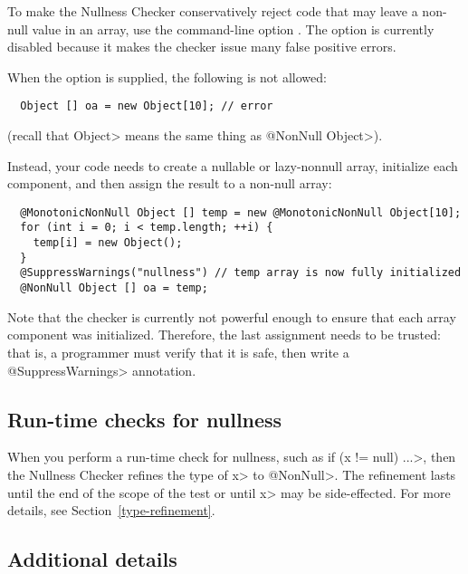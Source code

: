 To make the Nullness Checker conservatively reject code that may leave a
non-null value in an array, use the command-line option
.  The option is currently disabled
because it makes the checker issue many false positive errors.

When the  option is supplied,
the following is not allowed:

\begin{Verbatim}
  Object [] oa = new Object[10]; // error
\end{Verbatim}

\noindent
(recall that \<Object> means the same thing as \<@NonNull Object>).

Instead, your code needs to create a nullable or lazy-nonnull array, initialize
each component, and then assign the result to a non-null array:

\begin{Verbatim}
  @MonotonicNonNull Object [] temp = new @MonotonicNonNull Object[10];
  for (int i = 0; i < temp.length; ++i) {
    temp[i] = new Object();
  }
  @SuppressWarnings("nullness") // temp array is now fully initialized
  @NonNull Object [] oa = temp;
\end{Verbatim}

Note that the checker is currently not powerful enough to ensure that
each array component was initialized. Therefore, the last assignment
needs to be trusted:  that is, a programmer must verify that it is safe,
then write a \<@SuppressWarnings> annotation.




\subsection{Run-time checks for nullness\label{nullness-runtime-checks}}

When you perform a run-time check for nullness, such as \<if (x != null)
...>, then the Nullness Checker refines the type of \<x> to
\<@NonNull>.  The refinement lasts until the end of the scope of the test
or until \<x> may be side-effected.  For more details, see
Section~\ref{type-refinement}.


\subsection{Additional details\label{nullness-additional-details}}

